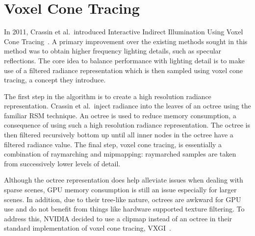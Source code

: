 \section{Voxel Cone Tracing}
In 2011, Crassin et al.\ introduced Interactive Indirect Illumination Using Voxel Cone Tracing~\cite{crassin2011interactive}. A primary improvement over the existing methods sought in this method was to obtain higher frequency lighting details, such as specular reflections. The core idea to balance performance with lighting detail is to make use of a filtered radiance representation which is then sampled using voxel cone tracing, a concept they introduce.

The first step in the algorithm is to create a high resolution radiance representation. Crassin et al.\ inject radiance into the leaves of an octree using the familiar RSM technique. An octree is used to reduce memory consumption, a consequence of using such a high resolution radiance representation. The octree is then filtered recursively bottom up until all inner nodes in the octree have a filtered radiance value. The final step, voxel cone tracing, is essentially a combination of raymarching and mipmapping: raymarched samples are taken from successively lower levels of detail.


Although the octree representation does help alleviate issues when dealing with sparse scenes, GPU memory consumption is still an issue especially for larger scenes. In addition, due to their tree-like nature, octrees are awkward for GPU use and do not benefit from things like hardware supported texture filtering. To address this, NVIDIA decided to use a clipmap instead of an octree in their standard implementation of voxel cone tracing, VXGI~\cite{nvidiavxgi}.




